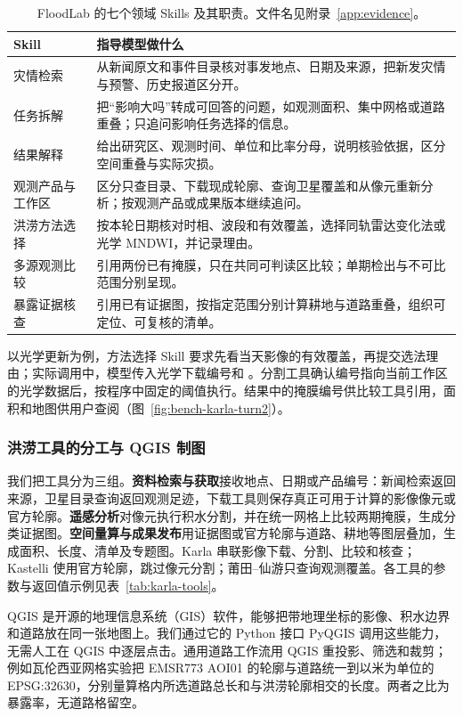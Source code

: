 \begin{table}[htbp]
\centering
\caption{FloodLab 的七个领域 Skills 及其职责。文件名见附录~\ref{app:evidence}。}
\label{tab:skills}
\small
\begin{tabularx}{\linewidth}{@{}>{\raggedright\arraybackslash}p{33mm}>{\raggedright\arraybackslash}X@{}}
\toprule
Skill & 指导模型做什么\\
\midrule
灾情检索 & 从新闻原文和事件目录核对事发地点、日期及来源，把新发灾情与预警、历史报道区分开。\\
任务拆解 & 把“影响大吗”转成可回答的问题，如观测面积、集中网格或道路重叠；只追问影响任务选择的信息。\\
结果解释 & 给出研究区、观测时间、单位和比率分母，说明核验依据，区分空间重叠与实际灾损。\\
观测产品与工作区 & 区分只查目录、下载现成轮廓、查询卫星覆盖和从像元重新分析；按观测产品或成果版本继续追问。\\
洪涝方法选择 & 按本轮日期核对时相、波段和有效覆盖，选择同轨雷达变化法或光学 MNDWI，并记录理由。\\
多源观测比较 & 引用两份已有掩膜，只在共同可判读区比较；单期检出与不可比范围分别呈现。\\
暴露证据核查 & 引用已有证据图，按指定范围分别计算耕地与道路重叠，组织可定位、可复核的清单。\\
\bottomrule
\end{tabularx}
\end{table}

以光学更新为例，方法选择 Skill 要求先看当天影像的有效覆盖，再提交选法理由；实际调用中，模型传入光学下载编号和 。分割工具确认编号指向当前工作区的光学数据后，按程序中固定的阈值执行。结果中的掩膜编号供比较工具引用，面积和地图供用户查阅（图~\ref{fig:bench-karla-turn2}）。

\subsubsection{洪涝工具的分工与 QGIS 制图}
我们把工具分为三组。\textbf{资料检索与获取}接收地点、日期或产品编号：新闻检索返回来源，卫星目录查询返回观测足迹，下载工具则保存真正可用于计算的影像像元或官方轮廓。\textbf{遥感分析}对像元执行积水分割，并在统一网格上比较两期掩膜，生成分类证据图。\textbf{空间量算与成果发布}用证据图或官方轮廓与道路、耕地等图层叠加，生成面积、长度、清单及专题图。Karla 串联影像下载、分割、比较和核查；Kastelli 使用官方轮廓，跳过像元分割；莆田--仙游只查询观测覆盖。各工具的参数与返回值示例见表~\ref{tab:karla-tools}。

QGIS 是开源的地理信息系统（GIS）软件，能够把带地理坐标的影像、积水边界和道路放在同一张地图上。我们通过它的 Python 接口 PyQGIS 调用这些能力\cite{qgis}，无需人工在 QGIS 中逐层点击。通用道路工作流用 QGIS 重投影、筛选和裁剪；例如瓦伦西亚网格实验把 EMSR773 AOI01 的轮廓与道路统一到以米为单位的 EPSG:32630，分别量算格内所选道路总长和与洪涝轮廓相交的长度。两者之比为暴露率，无道路格留空。

